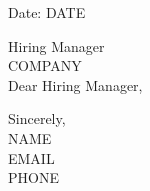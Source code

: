 \documentclass[11pt]{article}
\begin{document}
\noindent Date: {{DATE}}

\vspace{10pt}
Hiring Manager \\
{{COMPANY}} \\

\vspace{10pt}
Dear Hiring Manager,


\vspace{10pt}
Sincerely, \\
{{NAME}} \\
{{EMAIL}} \\
{{PHONE}}
\end{document}
